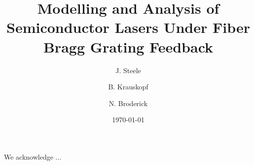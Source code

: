 \documentclass[
  reprint,            %
  amsmath,amssymb,    %
  aps,pre             %
]{revtex4-2}
\begin{document}

\title{Modelling and Analysis of Semiconductor Lasers Under Fiber Bragg Grating Feedback}

\author{J. Steele}
\author{B. Krauskopf}
\author{N. Broderick}


\date{\today}





\maketitle





\begin{acknowledgments}
We acknowledge ...
\end{acknowledgments}

\appendix


\end{document}
